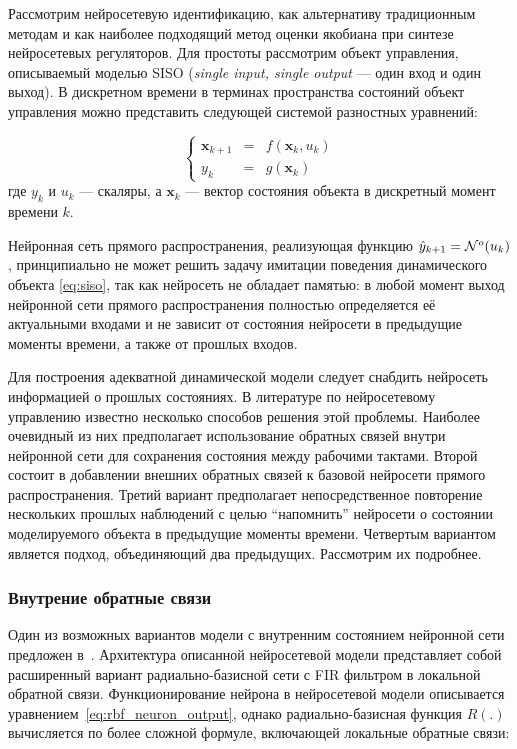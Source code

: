 
Рассмотрим нейросетевую идентификацию, как альтернативу традиционным
методам и как наиболее подходящий метод оценки якобиана при синтезе
нейросетевых регуляторов.  Для простоты рассмотрим объект управления,
описываемый моделью SISO ({\it single input, single output} --- один
вход и один выход).  В дискретном времени в терминах пространства
состояний объект управления можно представить следующей системой
разностных уравнений:

\begin{equation}\label{eq:siso}
\left\{\begin{array}{rcl}
  \mathbf{x}_{k+1} & = & f(\mathbf{x}_k, u_k) \\
  y_k & = & g(\mathbf{x}_k)
\end{array}\right.
\end{equation} где $y_k$ и $u_k$ --- скаляры, а $\mathbf{x}_k$ --- вектор
состояния объекта в дискретный момент времени $k$.

Нейронная сеть прямого распространения, реализующая функцию
$\hat{y}_{k+1} = \mathcal{N}^o(u_k)$, принципиально не может решить задачу
имитации поведения динамического объекта \eqref{eq:siso}, так как
нейросеть не обладает памятью: в любой момент выход нейронной сети
прямого распространения полностью определяется её актуальными
входами и не зависит от состояния нейросети в предыдущие моменты
времени, а также от прошлых входов.

Для построения адекватной динамической модели следует снабдить
нейросеть информацией о прошлых состояниях.  В литературе по
нейросетевому управлению известно несколько способов решения этой
проблемы.  Наиболее очевидный из них предполагает использование
обратных связей внутри нейронной сети для сохранения состояния между
рабочими тактами.  Второй состоит в добавлении внешних обратных связей
к базовой нейросети прямого распространения.  Третий вариант
предполагает непосредственное повторение нескольких прошлых наблюдений
с целью ``напомнить'' нейросети о состоянии моделируемого объекта в
предыдущие моменты времени.  Четвертым вариантом является подход,
объединяющий два предыдущих.  Рассмотрим их подробнее.

\subsubsection{Внутрение обратные связи}

Один из возможных вариантов модели с внутренним состоянием нейронной
сети предложен в~\cite{boquete99}.  Архитектура описанной нейросетевой
модели представляет собой расширенный вариант радиально-базисной сети
с FIR фильтром в локальной обратной связи.  Функционирование нейрона в
нейросетевой модели описывается
уравнением~\eqref{eq:rbf_neuron_output}, однако радиально-базисная
функция $R(.)$ вычисляется по более сложной формуле, включающей
локальные обратные связи:

